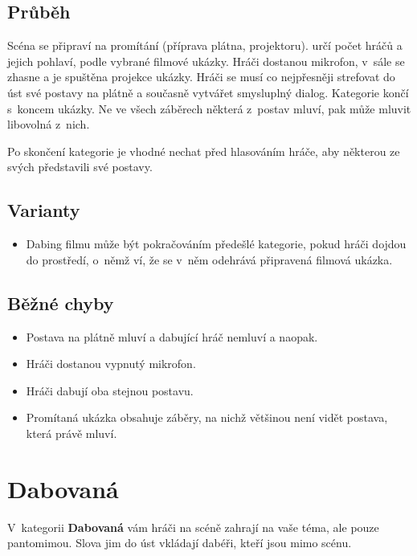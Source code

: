 \subsection{ Průběh } Scéna se připraví na promítání (příprava plátna, projektoru).  určí počet hráčů a jejich pohlaví, podle vybrané filmové ukázky. Hráči dostanou mikrofon, v~sále se zhasne a je spuštěna projekce ukázky. Hráči se musí co nejpřesněji strefovat do úst své postavy na plátně a současně vytvářet smysluplný dialog. Kategorie končí s~koncem ukázky. Ne ve všech záběrech některá z~postav mluví, pak může mluvit libovolná z~nich. 
 
Po skončení kategorie je vhodné nechat před hlasováním hráče, aby některou ze svých  představili své postavy. 
 
\subsection{ Varianty } \begin{itemize}
\item Dabing filmu může být pokračováním předešlé kategorie, pokud hráči dojdou do prostředí, o~němž  ví, že se v~něm odehrává připravená filmová ukázka.
\end{itemize}
 
\subsection{ Běžné chyby } \begin{itemize}
\item Postava na plátně mluví a dabující hráč nemluví a naopak.
\item Hráči dostanou vypnutý mikrofon.
\item Hráči dabují oba stejnou postavu.
\item Promítaná ukázka obsahuje záběry, na nichž většinou není vidět postava, která právě mluví.
\end{itemize}
 
 
 
 
 
\needspace{5cm} \section{Dabovaná} \label{dabovaná}  
 
 
V~kategorii \textbf{Dabovaná} vám hráči na scéně zahrají na vaše téma, ale pouze pantomimou. Slova jim do úst vkládají dabéři, kteří jsou mimo scénu. 
 
